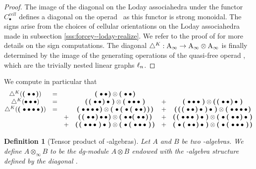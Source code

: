 \documentclass[twoside, 12pt]{amsart}
\newtheorem{definition}{Definition}[section]
\theoremstyle{remark}
\begin{document}
\begin{proof}
The image of the diagonal on the Loday associahedra under the functor $C_\bullet^{cell}$ defines a diagonal on the operad \Ainf\ as this functor is strong monoidal. 
The signs arise from the choices of cellular orientations on the Loday associahedra made in subsection \ref{sss:forcey--loday-realize}. We refer to the proof of \cite[Proposition 4.27]{LA21} for more details on the sign computations. The diagonal $\diagainf : \Ainf \rightarrow \Ainf \otimes \Ainf$ is finally determined by the image of the generating operations of the quasi-free operad \Ainf , which are the trivially nested linear graphs $\gra_n$.
\end{proof}

We compute in particular that
\[ \begin{matrix}
\diagainf ( \black { \bullet \bullet } ) &=& & \black{\bullet \bullet} \otimes \black{\bullet \bullet} & & \\
\diagainf ( \bullet \bullet \bullet ) &=& & \black{\black{\bullet \bullet} \bullet} \otimes \black{\bullet \bullet \bullet} &+& \black{\bullet \bullet \bullet} \otimes \black{\black{\bullet \bullet} \bullet} \\
\diagainf ( \black{ \bullet \bullet \bullet \bullet} ) 
&=& & \black{\bullet \bullet \bullet \bullet} \otimes \black{\bullet \black{ \bullet \black{ \bullet \bullet }} }  &+& \black{ \black{ \black{\bullet \bullet} \bullet } \bullet }  \otimes \black{ \bullet \bullet \bullet \bullet } \\
& & +& \black{ \black{\bullet \bullet } \bullet \bullet } \otimes \black{ \bullet \bullet \black{ \bullet \bullet }}  &+& \black{ \black{ \bullet \bullet \bullet } \bullet }  \otimes \black{ \bullet \black{ \bullet \bullet } \bullet }  \\ 
& & +& \black{ \black{ \bullet \bullet \bullet } \bullet }  \otimes \black{ \bullet \black{ \bullet \bullet \bullet }} &+& \black{ \bullet \black{ \bullet \bullet } \bullet } \otimes \black{ \bullet \black{ \bullet \bullet \bullet }}
\end{matrix} \]


\begin{definition}[Tensor product of \Ainf -algebras] \label{def:tensor-product-ainf-alg}
Let $A$ and $B$ be two \Ainf -algebras. We define $A \otimes_\infty B$ to be the dg-module $A \otimes B$ endowed with the \Ainf -algebra structure defined by the diagonal \diagainf .
\end{definition}
\end{document}
